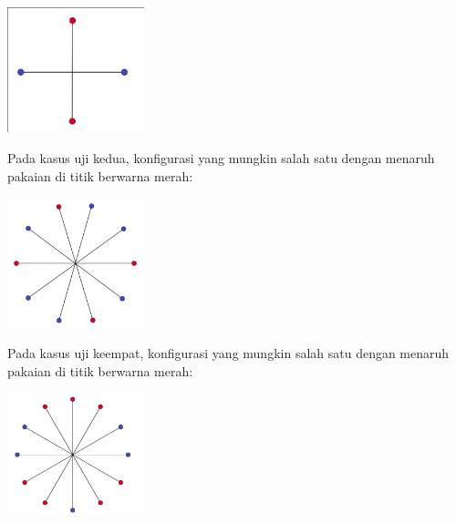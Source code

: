 \documentclass{article}
\begin{document}
\includegraphics[width=150px]{sample-1}

Pada kasus uji kedua, konfigurasi yang mungkin salah satu dengan menaruh pakaian di titik berwarna merah:

\includegraphics[width=150px]{sample-2}

Pada kasus uji keempat, konfigurasi yang mungkin salah satu dengan menaruh pakaian di titik berwarna merah:

\includegraphics[width=150px]{sample-4}
\end{document}
